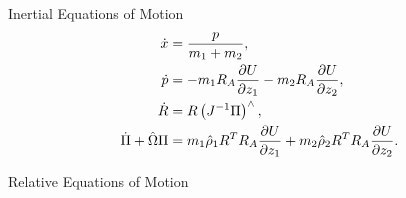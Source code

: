 \begin{frame}{Inertial Equations of Motion}
\begin{align}
    \dot {x} &= \frac{p}{m_1 + m_2}, \\
    \dot {p} &= - m_1 R_A \frac{\partial U}{\partial z_1} - m_2 R_A \frac{\partial U}{\partial z_2}, \\
    \dot {R} &= R \left( J^{-1} \Pi \right)^\wedge, \\
    \dot{\Pi}  + \hat{\Omega} \Pi &= m_1 \hat{\rho}_1 R^T R_A \frac{\partial U}{\partial z_1} + m_2 \hat{\rho}_2 R^T R_A \frac{\partial U}{\partial z_2}. 
\end{align}

\end{frame}

\begin{frame}{Relative Equations of Motion}

\end{frame}
